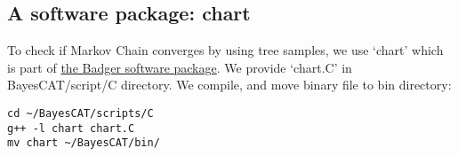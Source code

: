 \documentclass[11pt]{article}
\begin{document}
\subsection{A software package: chart}
\label{sec-3-3}
To check if Markov Chain converges by using tree samples, we use `chart' which is part of \href{http://badger.duq.edu/}{the Badger software package}.
We provide `chart.C' in BayesCAT/script/C directory. We compile, and move binary file to bin directory:
\begin{lstlisting}
cd ~/BayesCAT/scripts/C
g++ -l chart chart.C
mv chart ~/BayesCAT/bin/
\end{lstlisting}
\end{document}
